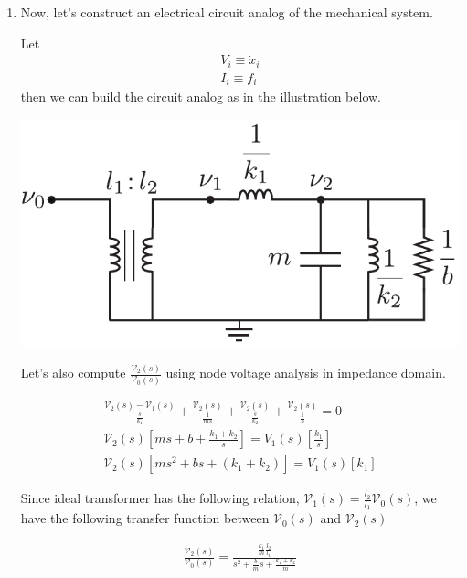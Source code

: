 \documentclass[twoside]{article}
\begin{document}
\begin{enumerate}
\item Now, let's construct an electrical circuit analog of the mechanical system.

Let 
%
\begin{align*}
	V_i \equiv \dot{x}_i
	\\
	I_i \equiv f_i
\end{align*}
%
then we can build the circuit analog as in the illustration below. 

  \begin{minipage}[h]{0.75\linewidth}
    \begin{center}
      \includegraphics[width=1\textwidth]{ex_elec}
    \end{center}
  \end{minipage}
  
  Let's also compute 
$\frac{\mathcal{V}_2(s)}{\mathcal{V_0}(s)}$ using node voltage analysis in impedance domain.

\begin{align*}
	\frac{\mathcal{V}_2(s) - \mathcal{V}_1(s) }{ \frac{s}{k_1} } + 
	\frac{\mathcal{V}_2(s)}{ \frac{1}{m s} } + 	\frac{\mathcal{V}_2(s)}{ \frac{s}{k_2} } +
	\frac{\mathcal{V}_2(s)}{ \frac{1}{b} } 
	= 0 
	\\
	\mathcal{V}_2(s) \left[ m s + b + \frac{k_1+k_2}{s} \right] = V_1(s) \left[  \frac{k_1}{s} \right]
	\\
	\mathcal{V}_2(s) \left[ m s^2 + b s + ( k_1 + k_2) \right] = V_1(s) \left[  k_1 \right]
\end{align*}

Since ideal transformer has the following relation, $\mathcal{V}_1(s) = \frac{l_2}{l_1} \mathcal{V}_0(s)$, 
we have the following transfer function between $\mathcal{V}_0(s)$ and $\mathcal{V}_2(s)$

\begin{align*}
\frac{\mathcal{V}_2(s)}{\mathcal{V}_0(s)} = \frac{\frac{k_1}{m} \frac{l_2}{l_1}}{s^2 + \frac{b}{m} s + \frac{k_1 + k_2}{m}}  
\end{align*}


\end{enumerate}
\end{document}
